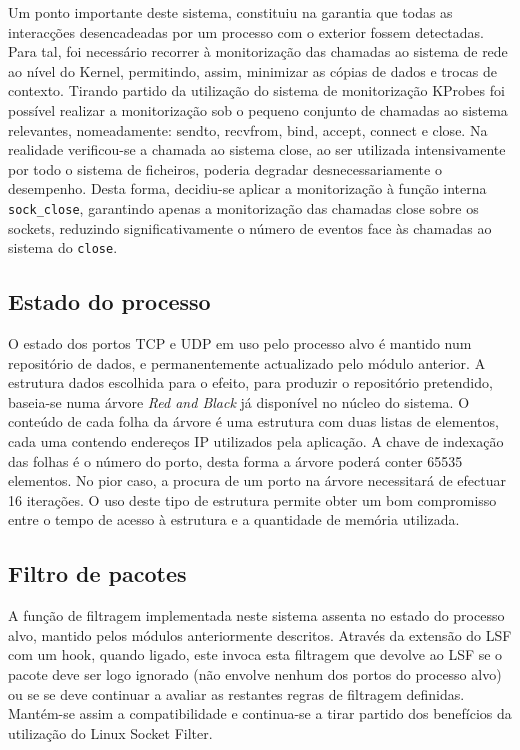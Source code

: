 \documentclass[a4paper]{llncs}
\newcommand{\td}[1]{\todo[inline]{#1}}
\begin{document}
Um ponto importante deste sistema, constituiu na garantia que todas as interacções desencadeadas por um processo com o exterior fossem detectadas. Para tal, foi necessário recorrer à monitorização das chamadas ao sistema de rede ao nível do Kernel, permitindo, assim, minimizar as cópias de dados e trocas de contexto. Tirando partido da utilização do sistema de monitorização KProbes foi possível realizar a monitorização sob o pequeno conjunto de chamadas ao sistema relevantes, nomeadamente: sendto, recvfrom, bind, accept, connect e close.
 Na realidade verificou-se a chamada ao sistema close, ao ser utilizada intensivamente por todo o sistema de ficheiros, poderia degradar desnecessariamente o desempenho. Desta forma, decidiu-se aplicar a monitorização à função interna \texttt{sock\_close}, garantindo apenas a monitorização das chamadas close sobre os sockets, reduzindo significativamente o número de eventos face às chamadas ao sistema do \texttt{close}.

\subsection*{Estado do processo}
\label{sub:data_repository}

O estado dos portos TCP e UDP em uso pelo processo alvo é mantido num repositório de dados, e permanentemente actualizado pelo módulo anterior. 
 A estrutura dados escolhida para o efeito, para produzir o repositório pretendido, baseia-se numa árvore \textit{Red and Black} já disponível no núcleo do sistema. O conteúdo de cada folha da árvore é uma estrutura com duas listas de elementos, cada uma contendo endereços IP utilizados pela aplicação. A chave de indexação das folhas é o número do porto, desta forma a árvore poderá conter 65535 elementos. No pior caso, a procura de um porto na árvore necessitará de efectuar 16 iterações.
  O uso deste tipo de estrutura permite obter um bom compromisso entre o tempo de acesso à estrutura e a quantidade de memória utilizada.


\subsection*{Filtro de pacotes}
\label{sub:packet_filter}

A função de filtragem  implementada neste sistema assenta no estado do processo alvo, mantido pelos módulos anteriormente descritos.
Através da extensão do LSF com um hook, quando ligado, este invoca esta filtragem que devolve ao LSF se o pacote deve ser logo ignorado (não envolve nenhum dos portos do processo alvo) ou se se deve continuar a avaliar as restantes regras de filtragem definidas. Mantém-se assim a compatibilidade e continua-se a tirar partido dos benefícios da utilização do Linux Socket Filter.
\end{document}
